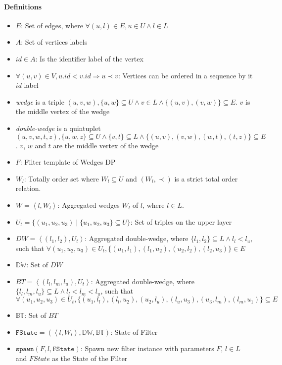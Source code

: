 \documentclass[12pt, a4paper]{article}
\newcommand{\dw}{\mathbb{DW}}
\newcommand{\bt}{\mathbb{BT}}
\newcommand{\st}{\mathtt{FState}}
\newcommand{\sw}{\mathtt{spawn}}
\newcommand{\la}{\left\langle}
\newcommand{\ra}{\right\rangle}
\begin{document}
\paragraph{Definitions}
\begin{itemize}
      \item $E$: Set of edges, where $\forall (u,l) \in E, u \in U \land l \in L$
      \item $A$: Set of vertices labels
      \item $id \in A$: Is the identifier label of the vertex
      \item $\forall (u,v) \in V, u.id < v.id \Rightarrow u \prec v$: Vertices can be ordered in a sequence by it $id$ label
      \item \textit{wedge} is a triple $(u,v,w), \{u,w\} \subseteq U  \land v \in L \land \{(u,v), (v,w)\} \subseteq E$. $v$ is the middle vertex of the wedge
      \item \textit{double-wedge} is a quintuplet $(u,v,w,t,z), \{u,w,z\} \subseteq U  \land \{v,t\} \subseteq L \land \{(u,v), (v,w), (w, t), (t,z)\} \subseteq E$. 
            $v$, $w$ and $t$ are the middle vertex of the wedge
      \item $F$: Filter template of Wedges DP
      \item $W_l$: Totally order set where $W_l \subseteq U$ and $(W_l, \prec)$ is a strict total order relation.
      \item $W = \la l, W_l \ra$: Aggregated wedges $W_l$ of $l$, where $l \in L$.
      \item $U_t = \{(u_1, u_2, u_3) \mid \{u_1, u_2, u_3\} \subseteq U\}$: Set of triples on the upper layer
      \item $DW = \la (l_1, l_2), U_t \ra$: Aggregated double-wedge, where $\{l_1, l_2\} \subseteq L \land l_l < l_u$, such that $\forall (u_1, u_2, u_3) \in U_t, \{(u_1, l_1), (l_1, u_2), (u_2, l_2), (l_2, u_3)\} \in E$
      \item $\dw$: Set of $DW$
      \item $BT = \la (l_l, l_m, l_u), U_t \ra$: Aggregated double-wedge, where $\{l_l, l_m, l_u\} \subseteq L \land l_l < l_m < l_u$, such that \\
       $\forall (u_1, u_2, u_3) \in U_t, \{(u_1, l_l), (l_l, u_2), (u_2, l_u), (l_u, u_3), (u_3, l_m), (l_m, u_1)\} \subseteq E$
      \item $\bt$: Set of $BT$
      \item $\st = (\la l, W_l \ra, \dw, \bt)$: State of Filter
      \item $\sw(F,l,\st)$: Spawn new filter instance with parameters $F$, $l \in L$ and $FState$ as the State of the Filter

\end{itemize}
\end{document}
